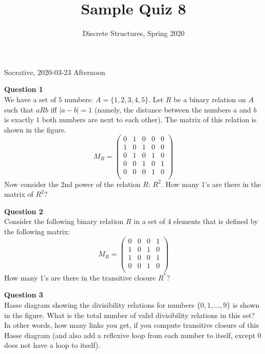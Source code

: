 \documentclass[jou]{apa6}
\title{Sample Quiz 8}
\author{Discrete Structures, Spring 2020}
\affiliation{RBS}
\begin{document}
\thispagestyle{empty}

\twocolumn
{\Large Socrative, 2020-03-23 Afternoon}

\vspace{6pt}
{\bf Question 1}\\
We have a set of $5$ numbers: $A = \{ 1,2,3,4,5 \}$. 
Let $R$ be a binary relation on $A$ such that $aRb$
iff $|a - b| = 1$ (namely, the distance between the numbers
$a$ and $b$ is exactly $1$ \textendash{} both numbers
are next to each other).  The matrix of this relation is shown 
in the figure.
$$M_R = \left( \begin{array}{ccccc}
0 & 1 & 0 & 0 & 0 \\
1 & 0 & 1 & 0 & 0 \\
0 & 1 & 0 & 1 & 0 \\
0 & 0 & 1 & 0 & 1 \\
0 & 0 & 0 & 1 & 0 \\
\end{array} \right)$$
Now consider the 2nd power of the relation $R$: $R^2$. 
How many 1's are there in the matrix of $R^2$?


\vspace{6pt}
{\bf Question 2}\\
Consider the following binary relation $R$ in a set of $4$ elements that 
is defined by the following matrix: 
$$M_R = \left( \begin{array}{cccc}
0 & 0 & 0 & 1 \\
1 & 0 & 1 & 0 \\
1 & 0 & 0 & 1 \\
0 & 0 & 1 & 0 \\
\end{array} \right)$$
How many 1's are there in the transitive closure $R^{\ast}$? 


\vspace{6pt}
{\bf Question 3}\\
Hasse diagram showing the divisibility relations for numbers 
$\{ 0,1,\ldots,9 \}$ is shown in the figure. 
What is the total number of valid divisibility relations 
in this set? In other words, how many links you get, if you 
compute transitive closure of this Hasse diagram (and also 
add a reflexive loop from each number to itself, except $0$
does not have a loop to itself). 

\end{document}
